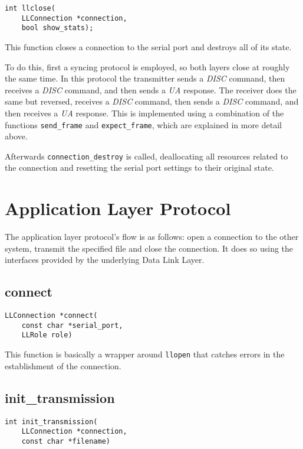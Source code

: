 \documentclass[11pt,a4paper,twocolumn]{article}
\begin{document}
\begin{lstlisting}
int llclose(
    LLConnection *connection, 
    bool show_stats);
\end{lstlisting}

This function closes a connection to the serial port and destroys all of its state.

To do this, first a syncing protocol is employed, so both layers close at roughly the same time.
In this protocol the transmitter sends a \textit{DISC} command, then receives a \textit{DISC} command, and then sends a \textit{UA} response.
The receiver does the same but reversed, receives a \textit{DISC} command, then sends a \textit{DISC} command, and then receives a \textit{UA} response.
This is implemented using a combination of the functions \lstinline{send_frame} and \lstinline{expect_frame}, which are explained in more detail above.

Afterwards \lstinline{connection_destroy} is called, deallocating all resources related to the connection and resetting the serial port settings to their original state.

\section{Application Layer Protocol}

The application layer protocol's flow is as follows: open a connection to the other system, transmit the specified file and close the connection. It does so using the interfaces provided by the underlying Data Link Layer.

\subsection{connect}

\begin{lstlisting}
LLConnection *connect(
    const char *serial_port,
    LLRole role)
\end{lstlisting}

This function is basically a wrapper around \lstinline{llopen} that catches errors in the establishment of the connection.

\subsection{init\_transmission}

\begin{lstlisting}
int init_transmission(
    LLConnection *connection,
    const char *filename)
\end{lstlisting}
\end{document}

